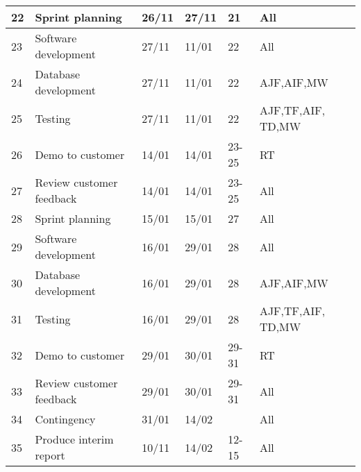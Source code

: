 \begin{longtable}{ | l | l | l | l | l | l | }
\hline
22 & Sprint planning & 26/11 & 27/11 & 21 & All \\ \hline
23 & Software development & 27/11 & 11/01 & 22 & All \\ \hline
24 & Database development & 27/11 & 11/01 & 22 & AJF,AIF,MW \\ \hline
25 & Testing & 27/11 & 11/01 & 22 & AJF,TF,AIF, TD,MW \\ \hline
26 & Demo to customer & 14/01 & 14/01 & 23-25 & RT \\ \hline
27 & Review customer feedback & 14/01 & 14/01 & 23-25 & All \\ \hline
\hline
28 & Sprint planning & 15/01 & 15/01 & 27 & All \\ \hline
29 & Software development & 16/01 & 29/01 & 28 & All \\ \hline
30 & Database development & 16/01 & 29/01 & 28 & AJF,AIF,MW \\ \hline
31 & Testing & 16/01 & 29/01 & 28 & AJF,TF,AIF, TD,MW \\ \hline
32 & Demo to customer & 29/01 & 30/01 & 29-31 & RT \\ \hline
33 & Review customer feedback & 29/01 & 30/01 & 29-31 & All \\ \hline
\hline
34 & Contingency & 31/01 & 14/02 & & All \\ \hline
35 & Produce interim report & 10/11 & 14/02 & 12-15 & All \\ \hline
\end{longtable}
